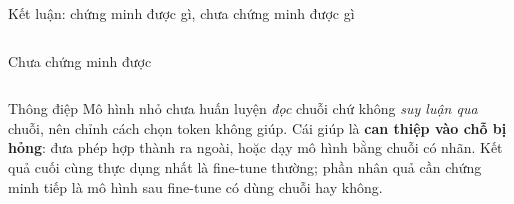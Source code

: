 \documentclass[aspectratio=169,t]{beamer}
\begin{document}
\begin{frame}[shrink]{Kết luận: chứng minh được gì, chưa chứng minh được gì}
\begin{columns}[T,onlytextwidth]
\begin{block}{Chưa chứng minh được}
\begin{itemize}
\end{itemize}
\end{block}
\end{columns}
\par\vspace{3pt}
\begin{alertblock}{Thông điệp}
\footnotesize Mô hình nhỏ chưa huấn luyện \emph{đọc} chuỗi chứ không \emph{suy luận qua} chuỗi, nên chỉnh cách chọn token không giúp. Cái giúp là \textbf{can thiệp vào chỗ bị hỏng}: đưa phép hợp thành ra ngoài, hoặc dạy mô hình bằng chuỗi có nhãn. Kết quả cuối cùng thực dụng nhất là fine-tune thường; phần nhân quả cần chứng minh tiếp là mô hình sau fine-tune có dùng chuỗi hay không.
\end{alertblock}
\par\kern0pt
\end{frame}
\end{document}
